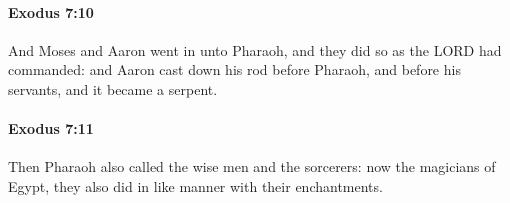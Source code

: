 		\paragraph{Exodus 7:10} %
			\label{EXODUS-7-10}

			And Moses and Aaron went in unto Pharaoh, and they did so as the LORD had commanded: and Aaron cast down his rod before Pharaoh, and before his servants, and it became a serpent.


		\paragraph{Exodus 7:11} %
			\label{EXODUS-7-11}

			Then Pharaoh also called the wise men and the sorcerers: now the magicians of Egypt, they also did in like manner with their enchantments.



